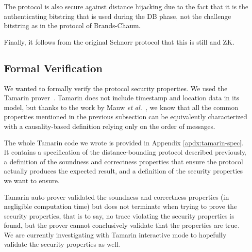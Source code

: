 The protocol is also secure against distance hijacking due to the fact
that it is the authenticating bitstring that is used during the \ac{DB}
phase, not the challenge bitstring as in the protocol of Brands-Chaum.

Finally, it follows from the original Schnorr protocol that this is still 
 and \ac{ZK}.

\subsection{Formal Verification}

We wanted to formally verify the protocol security properties. We used the Tamarin prover~\cite{meier2013tamarin}. Tamarin does not include timestamp and location data in its model, but thanks to the work by Mauw \emph{et al.}~\cite{TamarinDB}, we know that all the common properties mentioned in the previous subsection can be equivalently characterized with a causality-based definition relying only on the order of messages.

The whole Tamarin code we wrote is provided in Appendix \ref{apdx:tamarin-spec}. It contains a specification of the distance-bounding protocol described previously, a definition of the soundness and correctness properties that ensure the protocol actually produces the expected result, and a definition of the security properties we want to ensure.

Tamarin auto-prover validated the soundness and correctness properties (in negligible computation time) but does not terminate when trying to prove the security properties, that is to say, no trace violating the security properties is found, but the prover cannot conclusively validate that the properties are true. We are currently investigating with Tamarin interactive mode to hopefully validate the security properties as well.
